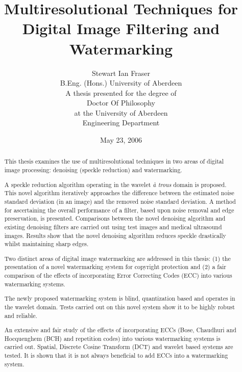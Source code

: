 \documentclass[12pt]{report}
\title{Multiresolutional Techniques for Digital Image Filtering and Watermarking}
\author{
        Stewart Ian Fraser \\
        B.Eng. (Hons.) University of Aberdeen \\
        A thesis presented for the degree of \\
        Doctor Of Philosophy \\
        at the University of Aberdeen \\
        Engineering Department
}
\date{May 23, 2006}
\begin{document}
\maketitle


\begin{abstract}
	\small
	This thesis examines the use of multiresolutional techniques 
	in two areas of digital image processing:
	denoising (speckle reduction) and watermarking.

	A speckle reduction algorithm operating in the wavelet \emph{\`a trous} 
	domain is proposed.
	This novel algorithm iteratively approaches the 
	difference between the estimated noise standard
	deviation (in an image) and the removed noise standard deviation.
	A method for ascertaining the overall performance of a filter, 
	based upon noise removal and edge preservation,
	is presented. Comparisons between the novel denoising algorithm and existing 
	denoising filters are carried out
	using test images and medical ultrasound images. 
	Results show that the novel denoising algorithm
	reduces speckle drastically whilst maintaining sharp edges.


	Two distinct areas of digital image watermarking are addressed in this thesis: 
	(1) the presentation of a novel watermarking
	system for copyright protection and 
	(2) a fair comparison of the effects of incorporating Error Correcting 
	Codes (ECC) into various watermarking systems.
	
	The newly proposed watermarking system is blind, quantization based 
	and operates in the wavelet domain.
	Tests carried out on this novel system show it to be highly robust and reliable.

	An extensive and fair study of the effects of incorporating 
	ECCs (Bose, Chaudhuri and Hocquenghem (BCH) and repetition codes)
	into various watermarking systems is carried out.
	Spatial, Discrete Cosine Transform (DCT) and wavelet based systems are tested. 
	It is shown that it is not always beneficial to add ECCs
	into a watermarking system.
	\normalsize
\end{abstract}
\end{document}
